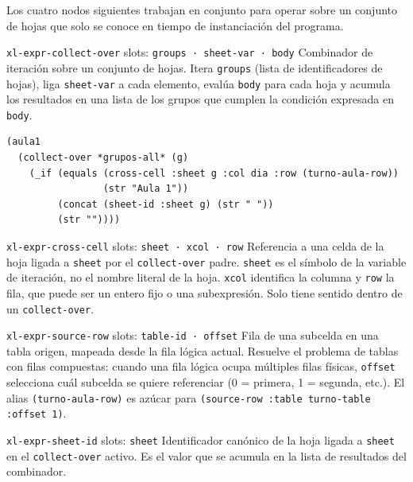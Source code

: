 \documentclass[12pt,a4paper]{report}
\begin{document}
Los cuatro nodos siguientes trabajan en conjunto para operar sobre un conjunto de hojas que solo se conoce en tiempo de instanciación del programa.

\begin{nodobox}{\texttt{xl-expr-collect-over} \quad \small\textmd{slots:} \texttt{groups · sheet-var · body}}
Combinador de iteración sobre un conjunto de hojas. Itera \texttt{groups} (lista de identificadores de hojas), liga \texttt{sheet-var} a cada elemento, evalúa \texttt{body} para cada hoja y acumula los resultados en una lista de los grupos que cumplen la condición expresada en \texttt{body}.

\begin{lstlisting}
(aula1
  (collect-over *grupos-all* (g)
    (_if (equals (cross-cell :sheet g :col dia :row (turno-aula-row))
                 (str "Aula 1"))
         (concat (sheet-id :sheet g) (str " "))
         (str ""))))
\end{lstlisting}
\end{nodobox}

\vspace{0.5em}

\begin{nodobox}{\texttt{xl-expr-cross-cell} \quad \small\textmd{slots:} \texttt{sheet · xcol · row}}
Referencia a una celda de la hoja ligada a \texttt{sheet} por el \texttt{collect-over} padre. \texttt{sheet} es el símbolo de la variable de iteración, no el nombre literal de la hoja. \texttt{xcol} identifica la columna y \texttt{row} la fila, que puede ser un entero fijo o una subexpresión. Solo tiene sentido dentro de un \texttt{collect-over}.
\end{nodobox}

\vspace{0.5em}

\begin{nodobox}{\texttt{xl-expr-source-row} \quad \small\textmd{slots:} \texttt{table-id · offset}}
Fila de una subcelda en una tabla origen, mapeada desde la fila lógica actual. Resuelve el problema de tablas con filas compuestas: cuando una fila lógica ocupa múltiples filas físicas, \texttt{offset} selecciona cuál subcelda se quiere referenciar (0 = primera, 1 = segunda, etc.). El alias \texttt{(turno-aula-row)} es azúcar para \texttt{(source-row :table turno-table :offset 1)}.
\end{nodobox}

\vspace{0.5em}

\begin{nodobox}{\texttt{xl-expr-sheet-id} \quad \small\textmd{slots:} \texttt{sheet}}
Identificador canónico de la hoja ligada a \texttt{sheet} en el \texttt{collect-over} activo. Es el valor que se acumula en la lista de resultados del combinador.
\end{nodobox}
\end{document}
